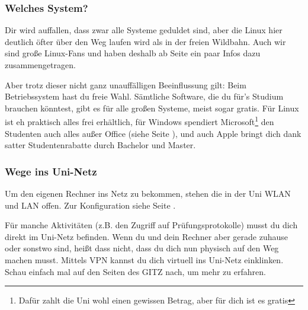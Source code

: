 \subsubsection{Welches System?}
Dir wird auffallen, dass zwar alle Systeme geduldet sind, aber die Linux hier
deutlich öfter über den Weg laufen wird als in der freien Wildbahn. Auch wir
sind große Linux-Fans und haben deshalb ab Seite \pageref{linux} ein paar Infos
dazu zusammengetragen.

Aber trotz dieser nicht ganz unauffälligen Beeinflussung gilt: Beim Betriebssystem 
hast du freie Wahl. Sämtliche Software, die du für's Studium brauchen 
könntest, gibt es für alle großen Systeme, meist sogar gratis. Für Linux ist eh 
praktisch alles frei erhältlich, für Windows spendiert 
Microsoft\footnote{Dafür zahlt die Uni wohl einen gewissen Betrag, aber für dich 
ist es gratis} den Studenten auch alles außer Office (siehe Seite \pageref{msdnaa}),
und auch Apple bringt dich dank satter Studentenrabatte durch Bachelor 
und Master. 

\subsubsection{Wege ins Uni-Netz}
Um den eigenen Rechner ins Netz zu bekommen, stehen die in der Uni WLAN und LAN 
offen. Zur Konfiguration siehe Seite \pageref{wlan}.

Für manche Aktivitäten (z.B. den Zugriff auf Prüfungsprotokolle) musst du dich 
direkt im Uni-Netz befinden. Wenn du und dein Rechner aber gerade zuhause oder sonstwo sind,
heißt dass nicht, dass du dich nun physisch auf den Weg machen musst. Mittels
VPN kannst du dich virtuell ins Uni-Netz einklinken. Schau einfach mal auf
den Seiten des GITZ nach, um mehr zu erfahren.

